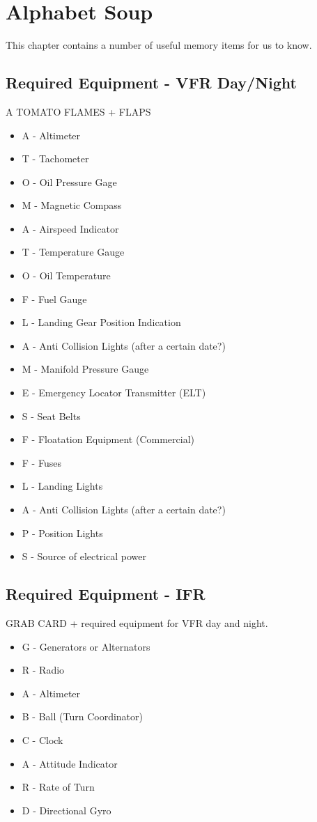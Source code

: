 \chapter{Alphabet Soup}

This chapter contains a number of useful memory items for us to know.

\section{Required Equipment - VFR Day/Night}

A TOMATO FLAMES + FLAPS

\begin{itemize}
\item A - Altimeter
\item T - Tachometer
\item O - Oil Pressure Gage
\item M - Magnetic Compass
\item A - Airspeed Indicator
\item T - Temperature Gauge
\item O - Oil Temperature
\item F - Fuel Gauge
\item L - Landing Gear Position Indication
\item A - Anti Collision Lights (after a certain date?)
\item M - Manifold Pressure Gauge
\item E - Emergency Locator Transmitter (ELT)
\item S - Seat Belts
\item F - Floatation Equipment (Commercial)
\item F - Fuses
\item L - Landing Lights
\item A - Anti Collision Lights (after a certain date?)
\item P - Position Lights
\item S - Source of electrical power
\end{itemize}

\section{Required Equipment - IFR}

GRAB CARD + required equipment for VFR day and night.

\begin{itemize}
\item G - Generators or Alternators
\item R - Radio
\item A - Altimeter
\item B - Ball (Turn Coordinator)
\item C - Clock
\item A - Attitude Indicator
\item R - Rate of Turn
\item D - Directional Gyro
\end{itemize}

